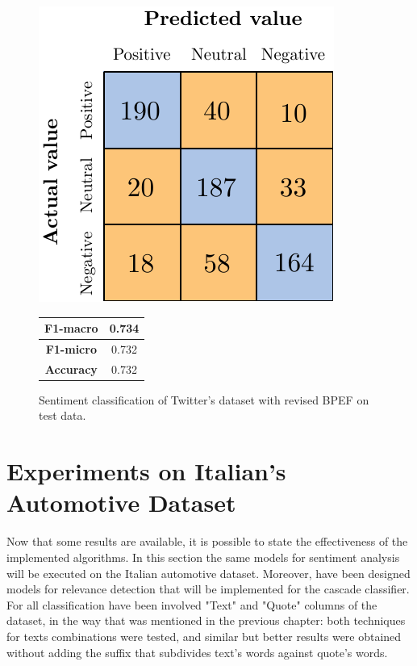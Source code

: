 \begin{figure}[H]
	\begin{minipage}[b]{0.6\linewidth}
		\centering
		\includegraphics[scale=1]{figures/conf_matrices/twitter_snt_bpef/twitter_snt_bpef_afs.pdf}
	\end{minipage}
	\begin{minipage}[b]{0.3\linewidth}
		\begin{tabular}[b]{ | c | c | } 
			\hline
			\textbf{F1-macro} & 0.734 \\
			\hline
			\textbf{F1-micro} & 0.732 \\ 
			\hline
			\textbf{Accuracy} & 0.732 \\ 
			\hline
		\end{tabular}
	\end{minipage}
	\caption{Sentiment classification of Twitter's dataset with revised BPEF on test data.}
	\label{fig:tw_snt_bpef_tst}
\end{figure}








\section{Experiments on Italian's Automotive Dataset}

Now that some results are available, it is possible to state the effectiveness of the implemented algorithms. In this section the same models for sentiment analysis will be executed on the Italian automotive dataset. Moreover, have been designed models for relevance detection that will be implemented for the cascade classifier. For all classification have been involved "Text" and "Quote" columns of the dataset, in the way that was mentioned in the previous chapter: both techniques for texts combinations were tested, and similar but better results were obtained without adding the suffix that subdivides text's words against quote's words. \\

